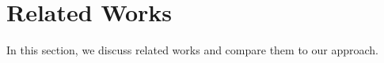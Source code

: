 \section{Related Works}
In this section, we discuss related works and compare them to our approach. 



 



